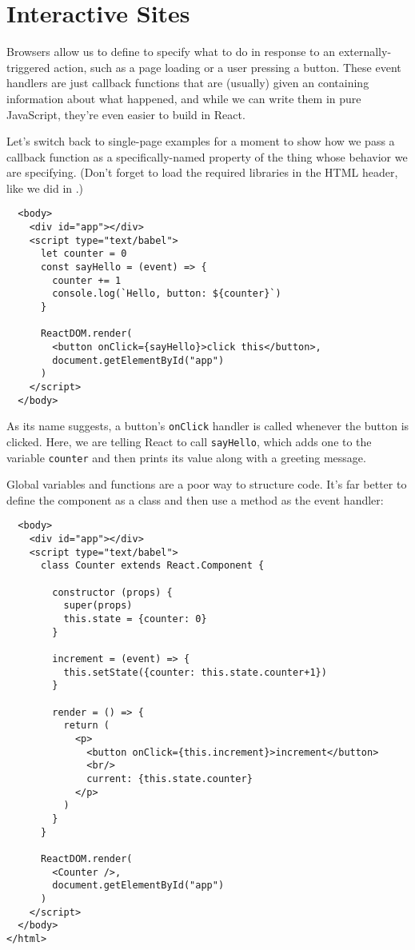 \chapter{Interactive Sites}\label{s:interactive}

Browsers allow us to define 
to specify what to do in response to an externally-triggered action,
such as a page loading or a user pressing a button.
These event handlers are just callback functions
that are (usually) given an 
containing information about what happened,
and while we can write them in pure JavaScript,
they're even easier to build in React.

Let's switch back to single-page examples for a moment
to show how we pass a callback function as
a specifically-named property of the thing whose behavior we are specifying.
(Don't forget to load the required libraries in the HTML header, like we did
in .)

\begin{verbatim}
  <body>
    <div id="app"></div>
    <script type="text/babel">
      let counter = 0
      const sayHello = (event) => {
        counter += 1
        console.log(`Hello, button: ${counter}`)
      }

      ReactDOM.render(
        <button onClick={sayHello}>click this</button>,
        document.getElementById("app")
      )
    </script>
  </body>
\end{verbatim}

As its name suggests,
a button's \texttt{onClick} handler is called whenever the button is clicked.
Here,
we are telling React to call \texttt{sayHello},
which adds one to the variable \texttt{counter}
and then prints its value along with a greeting message.

Global variables and functions are a poor way to structure code.
It's far better to define the component as a class
and then use a method as the event handler:

\begin{verbatim}
  <body>
    <div id="app"></div>
    <script type="text/babel">
      class Counter extends React.Component {

        constructor (props) {
          super(props)
          this.state = {counter: 0}
        }

        increment = (event) => {
          this.setState({counter: this.state.counter+1})
        }

        render = () => {
          return (
            <p>
              <button onClick={this.increment}>increment</button>
              <br/>
              current: {this.state.counter}
            </p>
          )
        }
      }

      ReactDOM.render(
        <Counter />,
        document.getElementById("app")
      )
    </script>
  </body>
</html>
\end{verbatim}

